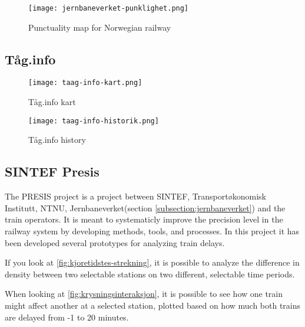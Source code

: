 \begin{figure}[!htbp]
	\texttt{[image: jernbaneverket-punklighet.png]}
	\caption[Punctuality map for Norwegian railway]{Punctuality map for Norwegian railway
	\cite{jernbaneverketPunklighetKart}}
	\label{fig:jernbaneverket-punklighet}
\end{figure}
\pagebreak


\subsection{Tåg.info}
\label{subsection:taag.info}



\begin{figure}[!htbp]
	\texttt{[image: taag-info-kart.png]}
	\caption[Tåg.info kart]{Tåg.info kart
	\cite{taagInfo}}
	\label{fig:taag-info-kart}
\end{figure}
\pagebreak

\begin{figure}[!htbp]
	\texttt{[image: taag-info-historik.png]}
	\caption[Tåg.info history]{Tåg.info history
	\cite{taagInfo}}
	\label{fig:taag-info-kart}
\end{figure}
\pagebreak


\subsection{SINTEF Presis}
\label{subsection:sintefPresis}

The PRESIS\cite{sintefPresis} project is a project between SINTEF\cite{sintef},
Transportøkonomisk Institutt\cite{transportOkonomiskInstitutt},
NTNU\cite{ntnu}, Jernbaneverket(section \vref{subsection:jernbaneverket}) and the train operators. It is meant to
systematicly improve the precision level in the railway system by developing
methods, tools, and processes. In this project it has been developed several
prototypes for analyzing train delays. 

If you look at \vref{fig:kjoretidstes-strekning}, it is possible to analyze the
difference in density between two selectable stations on two different,
selectable time periods. 

When looking at \vref{fig:krysningsinteraksjon}, it is possible to see how one
train might affect another at a selected station, plotted based on how much
both trains are delayed from -1 to 20 minutes. 



